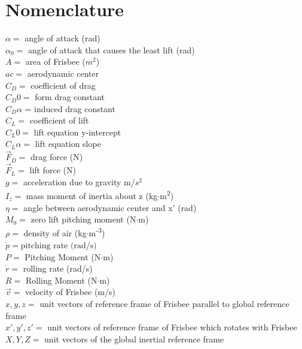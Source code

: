 \documentclass[12pt,twoside,letterpaper]{article}
\begin{document}


\tableofcontents
\newpage

\listoffigures
\newpage


\section{Nomenclature}
{ 
$\alpha = $ angle of attack (rad)\cite{Morrison2005}\\
$\alpha_0 = $ angle of attack that causes the least lift (rad)\cite{Baumback2010}\\
$A = $ area of Frisbee ($m^2$) \\
$ac = $ aerodynamic center\\
$C_D = $ coefficient of drag \cite{Morrison2005}\\
$C_D0 = $ form drag constant \cite{Baumback2010}\\ 
$C_D\alpha$ = induced drag constant \cite{Baumback2010}\\
$C_L = $ coefficient of lift \cite{Baumback2010}\\
$C_L0 = $ lift equation y-intercept \cite{Baumback2010}\\ 
$C_L\alpha = $ lift equation slope\\
$\vec{F}_D = $ drag force (N)\\
$\vec{F}_L = $ lift force (N)\\
$g = $ acceleration due to gravity m/$s^2$\\
$I_z = $ mass moment of inertia about z (kg$\cdot$m\textsuperscript{2})\\
$\eta = $ angle between aerodynamic center and x' (rad)\\
$M_0 = $ zero lift pitching moment (N$\cdot$m)\\ 
$\rho = $ density of air (kg$\cdot$m\textsuperscript{-3})\\
$\dot{p} = \text{pitching rate (rad/s)}$\\
$P = $  Pitching Moment (N$\cdot$m)\\
$\dot{r} = $ rolling rate (rad/s)\\
$R = $ Rolling Moment (N$\cdot$m)\\
$\vec{v} = $ velocity of Frisbee (m/s)\\
$x,y,z = $ unit vectors of reference frame of Frisbee parallel to global reference frame\\
$x',y',z' = $ unit vectors of reference frame of Frisbee which rotates with Frisbee\\
$X,Y,Z = $ unit vectors of the global inertial reference frame\\
}
\newpage
\end{document}
